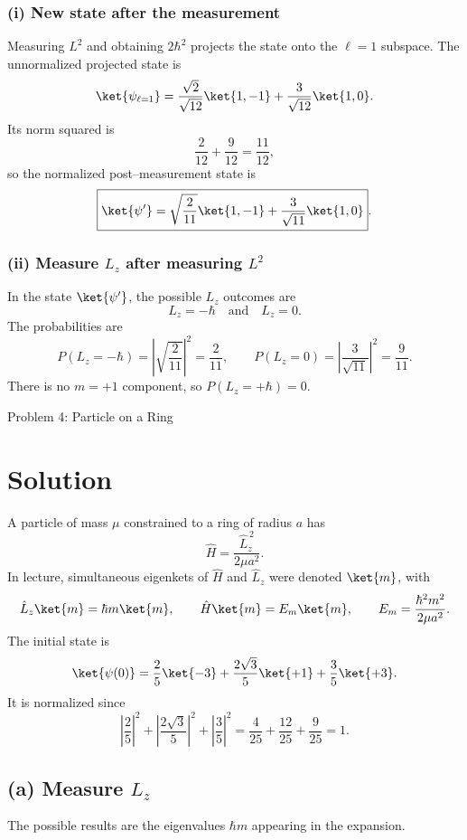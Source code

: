 \documentclass{article}
\begin{document}
\subsubsection*{(i) New state after the measurement}

Measuring $L^2$ and obtaining $2\hbar^2$ projects the state onto the $\ell=1$ subspace.
The unnormalized projected state is
\[
\ket{\psi_{\ell=1}}
=
\frac{\sqrt{2}}{\sqrt{12}}\ket{1,-1}
+
\frac{3}{\sqrt{12}}\ket{1,0}.
\]
Its norm squared is
\[
\frac{2}{12}+\frac{9}{12}=\frac{11}{12},
\]
so the normalized post--measurement state is
\[
\boxed{
\ket{\psi'}
=
\sqrt{\frac{2}{11}}\ket{1,-1}
+
\frac{3}{\sqrt{11}}\ket{1,0}
}.
\]

\subsubsection*{(ii) Measure $L_z$ after measuring $L^2$}

In the state $\ket{\psi'}$, the possible $L_z$ outcomes are
\[
L_z=-\hbar \quad \text{and} \quad L_z=0.
\]
The probabilities are
\[
P(L_z=-\hbar)=\left|\sqrt{\frac{2}{11}}\right|^2=\frac{2}{11},\qquad
P(L_z=0)=\left|\frac{3}{\sqrt{11}}\right|^2=\frac{9}{11}.
\]
There is no $m=+1$ component, so $P(L_z=+\hbar)=0$.

\newpage

{\huge Problem 4: Particle on a Ring}

\section*{Solution}

A particle of mass $\mu$ constrained to a ring of radius $a$ has
\[
\hat H=\frac{\hat L_z^{\,2}}{2\mu a^2}.
\]
In lecture, simultaneous eigenkets of $\hat H$ and $\hat L_z$ were denoted $\ket{m}$, with
\[
\hat L_z\ket{m}=\hbar m\ket{m},
\qquad
\hat H\ket{m}=E_m\ket{m},
\qquad
E_m=\frac{\hbar^2 m^2}{2\mu a^2}.
\]
The initial state is
\[
\ket{\psi(0)}
=\frac{2}{5}\ket{-3}
+\frac{2\sqrt{3}}{5}\ket{+1}
+\frac{3}{5}\ket{+3}.
\]
It is normalized since
\[
\left|\frac{2}{5}\right|^2+\left|\frac{2\sqrt3}{5}\right|^2+\left|\frac{3}{5}\right|^2
=\frac{4}{25}+\frac{12}{25}+\frac{9}{25}=1.
\]

\subsection*{(a) Measure $L_z$}

The possible results are the eigenvalues $\hbar m$ appearing in the expansion.
\end{document}
